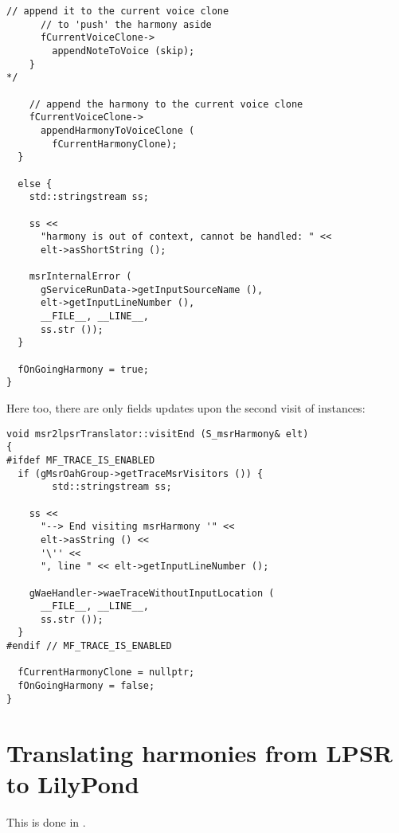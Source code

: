 \begin{lstlisting}[language=CPlusPlus]
      // append it to the current voice clone
      // to 'push' the harmony aside
      fCurrentVoiceClone->
        appendNoteToVoice (skip);
    }
*/

    // append the harmony to the current voice clone
    fCurrentVoiceClone->
      appendHarmonyToVoiceClone (
        fCurrentHarmonyClone);
  }

  else {
    std::stringstream ss;

    ss <<
      "harmony is out of context, cannot be handled: " <<
      elt->asShortString ();

    msrInternalError (
      gServiceRunData->getInputSourceName (),
      elt->getInputLineNumber (),
      __FILE__, __LINE__,
      ss.str ());
  }

  fOnGoingHarmony = true;
}
\end{lstlisting}

\pagebreak

Here too, there are only fields updates upon the second visit of  instances:
\begin{lstlisting}[language=CPlusPlus]
void msr2lpsrTranslator::visitEnd (S_msrHarmony& elt)
{
#ifdef MF_TRACE_IS_ENABLED
  if (gMsrOahGroup->getTraceMsrVisitors ()) {
		std::stringstream ss;

    ss <<
      "--> End visiting msrHarmony '" <<
      elt->asString () <<
      '\'' <<
      ", line " << elt->getInputLineNumber ();

    gWaeHandler->waeTraceWithoutInputLocation (
      __FILE__, __LINE__,
      ss.str ());
  }
#endif // MF_TRACE_IS_ENABLED

  fCurrentHarmonyClone = nullptr;
  fOnGoingHarmony = false;
}
\end{lstlisting}


\section{Translating harmonies from LPSR to LilyPond}

This is done in \lpsrToLilypond{}.

